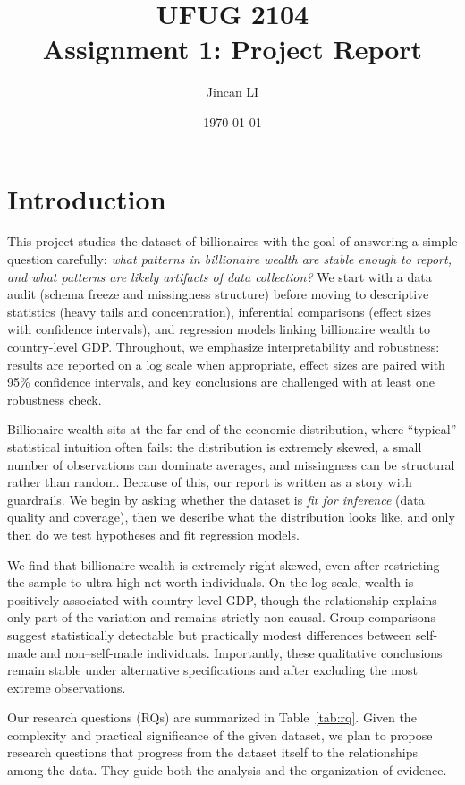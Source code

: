 \documentclass[a4paper,10pt]{article}
\begin{document}
\title{UFUG 2104 \\ Assignment 1: Project Report}
\author{Jincan LI}
\date{\today}
\maketitle


\section{Introduction}

This project studies the dataset of billionaires with the goal of answering a simple question carefully: \emph{what patterns in billionaire wealth are stable enough to report, and what patterns are likely artifacts of data collection?}
We start with a data audit (schema freeze and missingness structure) before moving to descriptive statistics (heavy tails and concentration), inferential comparisons (effect sizes with confidence intervals), and regression models linking billionaire wealth to country-level GDP.
Throughout, we emphasize interpretability and robustness: results are reported on a log scale when appropriate, effect sizes are paired with 95\% confidence intervals, and key conclusions are challenged with at least one robustness check.

Billionaire wealth sits at the far end of the economic distribution, where ``typical'' statistical intuition often fails: the distribution is extremely skewed, a small number of observations can dominate averages, and missingness can be structural rather than random.
Because of this, our report is written as a story with guardrails.
We begin by asking whether the dataset is \emph{fit for inference} (data quality and coverage), then we describe what the distribution looks like, and only then do we test hypotheses and fit regression models.

We find that billionaire wealth is extremely right-skewed, even after restricting the sample to ultra-high-net-worth individuals. 
On the log scale, wealth is positively associated with country-level GDP, though the relationship explains only part of the variation and remains strictly non-causal. 
Group comparisons suggest statistically detectable but practically modest differences between self-made and non–self-made individuals. 
Importantly, these qualitative conclusions remain stable under alternative specifications and after excluding the most extreme observations.

Our research questions (RQs) are summarized in Table~\ref{tab:rq}. 
Given the complexity and practical significance of the given dataset, 
we plan to propose research questions that progress from the dataset itself to the relationships among the data.
 They guide both the analysis and the organization of evidence.
\begin{table}[H]
\centering
\caption{Research questions used in this report (English version).}
\label{tab:rq}
\small

\end{table}
\end{document}
